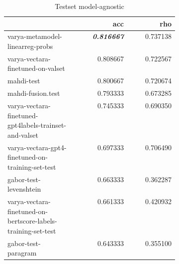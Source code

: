 \begin{table}
\caption{Testset model-agnostic}
\label{test-agnostic}
\begin{tabular}{|p{0.4\linewidth}|r|r|}
\hline
 & acc & rho \\
\hline
varya-metamodel-linearreg-probs & \textit{\textbf{0.816667}} & 0.737138 \\
\cline{1-3}
varya-vectara-finetuned-on-valset & 0.808667 & 0.722567 \\
\cline{1-3}
mahdi-test & 0.800667 & 0.720674 \\
\cline{1-3}
mahdi-fusion.test & 0.793333 & 0.673285 \\
\cline{1-3}
varya-vectara-finetuned-gpt4labels-trainset-and-valset & 0.745333 & 0.690350 \\
\cline{1-3}
varya-vectara-gpt4-finetuned-on-training-set-test & 0.697333 & 0.706490 \\
\cline{1-3}
gabor-test-levenshtein & 0.663333 & 0.362287 \\
\cline{1-3}
varya-vectara-finetuned-on-bertscore-labels-training-set-test & 0.661333 & 0.420932 \\
\cline{1-3}
gabor-test-paragram & 0.643333 & 0.355100 \\
\cline{1-3}
\hline
\end{tabular}
\end{table}
